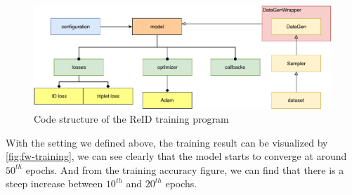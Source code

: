 \begin{figure}
    \includegraphics[width=\linewidth]{figures/framework_reid_code_overview.pdf}
    \caption{Code structure of the ReID training program}
    \label{fig:fw-reid-code-overview}
\end{figure}

With the setting we defined above, the training result can be visualized by
\autoref{fig:fw-training}, we can see clearly that the model starts to converge
at around $50^{th}$ epochs. And from the training accuracy figure, we can find
that there is a steep increase between $10^{th}$ and $20^{th}$ epochs.

